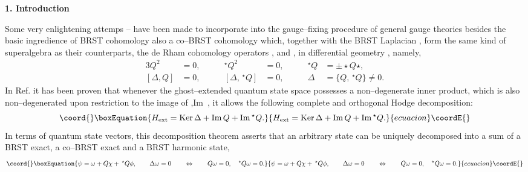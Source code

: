 \documentclass[a4paper,11pt]{article}
\begin{document}
\bigskip\medskip
\begin{flushleft}
{\large{\bf 1. Introduction}}
\end{flushleft}
\bigskip
Some very enlightening attemps \cite{1} -- \cite{8} have been made to 
incorporate into the gauge--fixing procedure of general gauge theories besides 
the basic ingredience of BRST cohomology \coordHE{} also a co--BRST cohomology 
\coordHE{} which, together with the BRST Laplacian \myHighlight{$\Delta$}\coordHE{}, form the 
same kind of superalgebra as their counterparts, the de Rham cohomology 
operators \coordHE{}, \coordHE{} and \coordHE{}, 
in differential geometry \cite{9}, namely,
\begin{alignat*}{3}
Q^2 &= 0, 
&\qquad  
^\star Q^2 &= 0,
&\qquad 
^\star Q &= \pm \star Q \star,
\\
[ \Delta, Q ] &= 0,
&\qquad 
[ \Delta, \,^\star Q ] &= 0,
&\qquad
\Delta &= \{ Q, \,^\star Q \} \neq 0.
\end{alignat*}
In Ref. \cite{8} it has been proven that whenever the ghost--extended 
quantum state space \coordHE{} possesses a non--degenerate inner product,
which is also non--degenerated upon restriction to the image of \coordHE{},Im\, \coordHE{}, it allows the 
following complete and orthogonal Hodge decomposition:
\begin{equation*}\coord{}\boxEquation{  
H_{\rm ext} = {\rm Ker}\, \Delta + {\rm Im}\, Q + {\rm Im} \,^\star Q.
}{  
H_{\rm ext} = {\rm Ker}\, \Delta + {\rm Im}\, Q + {\rm Im} \,^\star Q.
}{ecuacion}\coordE{}\end{equation*}
In terms of quantum state vectors, this decomposition theorem asserts 
that an arbitrary state \coordHE{} can be uniquely decomposed 
into a sum of a BRST exact, a co--BRST exact and a BRST harmonic state,
\begin{equation*}\coord{}\boxEquation{
\psi = \omega + Q \chi + \,^\star Q \phi,
\qquad
\Delta \omega = 0
\qquad
\Leftrightarrow
\qquad
Q \omega = 0,
\quad
^\star Q \omega = 0.
}{
\psi = \omega + Q \chi + \,^\star Q \phi,
\qquad
\Delta \omega = 0
\qquad
\Leftrightarrow
\qquad
Q \omega = 0,
\quad
^\star Q \omega = 0.
}{ecuacion}\coordE{}\end{equation*}
\end{document}

